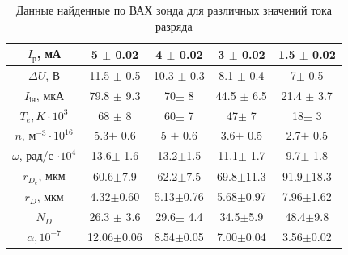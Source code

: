 \begin{table}[h!]
    \centering
    \begin{tabular}{|c|c|c|c|c|}
        \hline
        $I_{\text{р}}$, мА & 5 $\pm$ 0.02 & 4 $\pm$ 0.02& 3 $\pm$ 0.02& 1.5 $\pm$ 0.02\\\hline
        $\Delta U$, В & 11.5 $\pm$ 0.5 & 10.3 $\pm$ 0.3 &  8.1 $\pm$ 0.4 & 7$\pm$ 0.5 \\\hline 
        $I_{\text{iн}}$, мкА & 79.8 $\pm$ 9.3 & 70$\pm$ 8& 44.5 $\pm$ 6.5 & 21.4 $\pm$ 3.7\\\hline 
        $T_e, K\cdot 10^3$& 68 $\pm$ 8 & 60$\pm$ 7 & 47$\pm$ 7&18$\pm$ 3\\\hline
        $n$, $\text{м}^{-3}\cdot 10^{16}$ & 5.3$\pm$ 0.6 & 5 $\pm$ 0.6& 3.6$\pm$ 0.5 & 2.7$\pm$ 0.5\\\hline
        $\omega$, рад/с $\cdot 10^4$& 13.6$\pm$ 1.6& 13.2$\pm$1.5 & 11.1$\pm$ 1.7& 9.7$\pm$ 1.8\\\hline
        $r_{D_e}$, мкм &  60.6$\pm$7.9& 62.2$\pm$7.5 & 69.8$\pm$11.3 &91.9$\pm$18.3 \\\hline
        $r_{D}$, мкм &  4.32$\pm$0.60& 5.13$\pm$0.76& 5.68$\pm$0.97 & 7.96$\pm$1.62 \\\hline
        $N_D$ & 26.3 $\pm$ 3.6 & 29.6$\pm$ 4.4&  34.5$\pm$5.9 & 48.4$\pm$9.8\\\hline
        $\alpha, 10^{-7}$ & 12.06$\pm$0.06&8.54$\pm$0.05 & 7.00$\pm$0.04 & 3.56$\pm$0.02 \\\hline
    \end{tabular}
    \caption{Данные найденные по ВАХ зонда для различных значений тока разряда}
\end{table}


